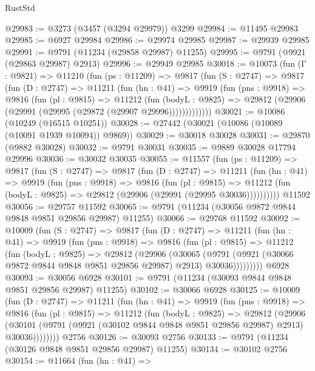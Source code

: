 \begin{lexlean}{RustStd}
\begin{coremodule}
@29983 := @3273 (@3457 (@3294 @29979)) @3299
@29984 := @11495 @29983
@29985 := @6927 @29984
@29986 := @29974 @29985
@29987 := @29939 @29985
@29991 := @9791 (@11234 (@29858 @29987) @11255)
@29995 := @9791 (@9921 (@29863 @29987) @2913)
@29996 := @29949 @29985
@30018 := @10073
    (fun (Γ : @9821) =>
    @11210
      (fun (ps : @11209) =>
      @9817
        (fun (S : @2747) =>
        @9817
          (fun (D : @2747) =>
          @11211
            (fun (hn : @41) =>
            @9919
              (fun (pns : @9918) =>
              @9816
                (fun (pl : @9815) =>
                @11212
                  (fun (bodyL : @9825) =>
                  @29812 (@29906 (@29991 (@29995 (@29872 (@29907 @29996)))))))))))))
@30021 := @10086 (@10249 (@16515 @10251))
@30028 := @27442 (@30021 (@10086 (@10089 (@10091 @1939 @10094)) @9869))
@30029 := @30018 @30028
@30031 := @29870 (@9882 @30028)
@30032 := @9791 @30031
@30035 := @9889 @30028 @17794 @29996
@30036 := @30032 @30035
@30055 := @11557
    (fun (ps : @11209) =>
    @9817
      (fun (S : @2747) =>
      @9817
        (fun (D : @2747) =>
        @11211
          (fun (hn : @41) =>
          @9919
            (fun (pns : @9918) =>
            @9816
              (fun (pl : @9815) =>
              @11212 (fun (bodyL : @9825) => @29812 (@29906 (@29991 (@29995 @30036))))))))))
    @11592
@30056 := @29757 @11592
@30065 := @9791 (@11234 (@30056 @9872 @9844 @9848 @9851 @29856 @29987) @11255)
@30066 := @29768 @11592
@30092 := @10009
    (fun (S : @2747) =>
    @9817
      (fun (D : @2747) =>
      @11211
        (fun (hn : @41) =>
        @9919
          (fun (pns : @9918) =>
          @9816
            (fun (pl : @9815) =>
            @11212
              (fun (bodyL : @9825) =>
              @29812
                (@29906
                  (@30065
                    (@9791
                      (@9921 (@30066 @9872 @9844 @9848 @9851 @29856 @29987) @2913)
                      @30036)))))))))
    @6928
@30093 := @30056 @6928
@30101 := @9791 (@11234 (@30093 @9844 @9848 @9851 @29856 @29987) @11255)
@30102 := @30066 @6928
@30125 := @10009
    (fun (D : @2747) =>
    @11211
      (fun (hn : @41) =>
      @9919
        (fun (pns : @9918) =>
        @9816
          (fun (pl : @9815) =>
          @11212
            (fun (bodyL : @9825) =>
            @29812
              (@29906
                (@30101 (@9791 (@9921 (@30102 @9844 @9848 @9851 @29856 @29987) @2913) @30036))))))))
    @2756
@30126 := @30093 @2756
@30133 := @9791 (@11234 (@30126 @9848 @9851 @29856 @29987) @11255)
@30134 := @30102 @2756
@30154 := @11664
    (fun (hn : @41) =>

\end{coremodule}
\end{lexlean}
